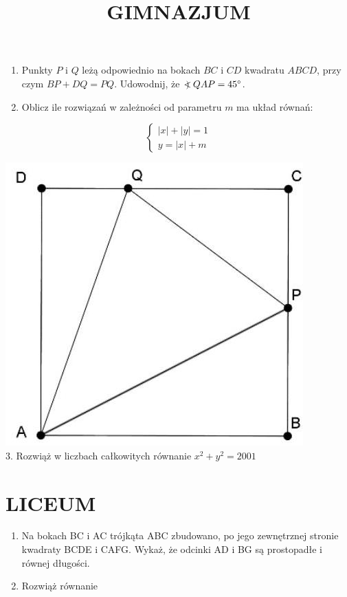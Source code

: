 \documentclass[10pt]{article}
\title{GIMNAZJUM }
\author{}
\date{}
\newcommand\Varangle{\mathop{{<\!\!\!\!\!\text{\small)}}\:}\nolimits}
\begin{document}
\maketitle
\begin{enumerate}
  \item Punkty \(P\) i \(Q\) leżą odpowiednio na bokach \(B C\) i \(C D\) kwadratu \(A B C D\), przy czym \(B P+D Q=P Q\). Udowodnij, że \(\Varangle Q A P=45^{\circ}\).
  \item Oblicz ile rozwiązań w zależności od parametru \(m\) ma układ równań:
\end{enumerate}

\[
\left\{\begin{array}{c}
|x|+|y|=1 \\
y=|x|+m
\end{array}\right.
\]

\includegraphics[max width=\textwidth, center]{2024_11_21_cdd85e6b4cedf5476676g-1}\\
3. Rozwiąż w liczbach całkowitych równanie \(x^{2}+y^{2}=2001\)

\section*{LICEUM}
\begin{enumerate}
  \item Na bokach BC i AC trójkąta ABC zbudowano, po jego zewnętrznej stronie kwadraty BCDE i CAFG. Wykaż, że odcinki AD i BG są prostopadłe i równej długości.
  \item Rozwiąż równanie
\end{enumerate}
\end{document}

